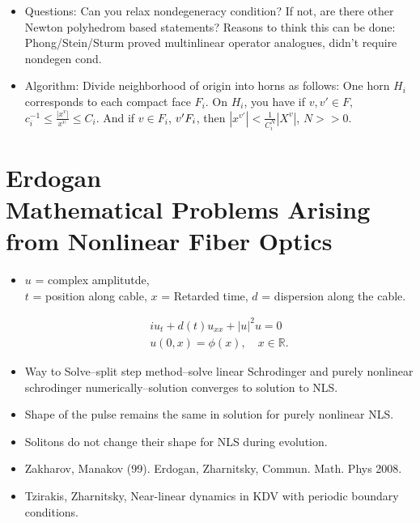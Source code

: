 \documentclass[12pt,reqno]{amsart}
\numberwithin{equation}{section}  %
\newcommand{\nin}{\noindent}
\newcommand{\rr}{\mathbb{R}}
\newtheorem{theorem}{Theorem}[section]
\begin{document}
\begin{itemize}
\begin{theorem}[Varchenko]
	    Condition $\nabla S_{F} \neq 0$ on $(\rr - \left\{ 0 \right\})^{n}$ for all $F$. 
	\end{theorem}
    \item{}
	Questions: Can you relax nondegeneracy condition? If not, are there other Newton polyhedrom based statements? Reasons to think this can be done: Phong/Stein/Sturm proved multinlinear operator analogues, didn't require nondegen cond.
    \item{}
	Algorithm: Divide neighborhood of origin into horns as follows: One horn $H_{i}$ corresponds to each compact face $F_{i}$. On $H_{i}$, you have if $v, v' \in F$, $c_{i}^{-1} \le \frac{| x^{v} |}{x^{v_{'}}} \le C_{i}$. And if $v \in F_{i}$, $v' \nin F_{i}$, then $| x^{v'} | < \frac{1}{C_{i}^{N}}| X^{v} |$, $N >>0$. 
\end{itemize}

\section{Erdogan \\ Mathematical Problems Arising from Nonlinear Fiber Optics}

\begin{itemize}
    \item 
	$u$ = complex amplitutde, \\
	$t$ = position along cable, $x$ = Retarded time, $d$ = dispersion along the cable. 

	\begin{gather*}
	    iu_{t} + d(t) u_{xx} + | u |^{2} u = 0
	    \\
	    u(0,x) = \phi(x), \quad x \in \rr.
	\end{gather*}
\end{itemize}
\begin{itemize}
    \item Way to Solve--split step method--solve linear Schrodinger and purely nonlinear schrodinger numerically--solution converges to solution to NLS.
    \item{}
	Shape of the pulse remains the same in solution for purely nonlinear NLS.
    \item{}
	Solitons do not change their shape for NLS during evolution.
    \item{}
	Zakharov, Manakov (99). Erdogan, Zharnitsky, Commun. Math. Phys 2008.
    \item{}
	Tzirakis, Zharnitsky, Near-linear dynamics in KDV with periodic boundary conditions.
\end{itemize}
\end{document}
